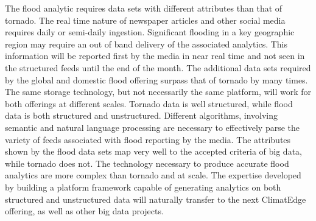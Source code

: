 The flood analytic requires data sets with different attributes than that of tornado. The real time nature of newspaper articles and other social media requires daily or semi-daily ingestion. Significant flooding in a key geographic region may require an out of band delivery of the associated analytics.  This information will be reported first by the media in near real time and not seen in the structured feeds until the end of the month. The additional data sets required by the global and domestic flood offering surpass that of tornado by many times. The same storage technology, but not necessarily the same platform, will work for both offerings at different scales. Tornado data is well structured, while flood data is both structured and unstructured. Different algorithms, involving semantic and natural language processing are necessary to effectively parse the variety of feeds associated with flood reporting by the media.  The attributes shown by the flood data sets map very well to the accepted criteria of big data, while tornado does not. The technology necessary to produce accurate flood analytics are more complex than tornado and at scale.  The expertise developed by building a platform framework capable of generating analytics on both structured and unstructured data will naturally transfer to the next ClimatEdge\texttrademark{} offering, as well as other big data projects.